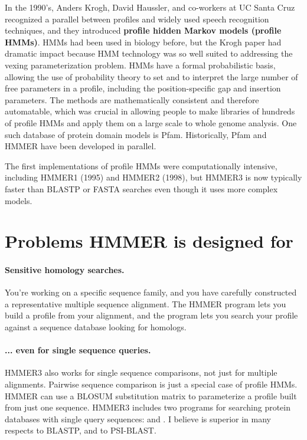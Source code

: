 In the 1990's, Anders Krogh, David Haussler, and co-workers at UC
Santa Cruz recognized a parallel between profiles and widely used
speech recognition techniques, and they introduced \textbf{profile
  hidden Markov models (profile HMMs)}.\cite{Krogh94} HMMs had been
used in biology before, but the Krogh paper had dramatic impact
because HMM technology was so well suited to addressing the vexing
parameterization problem. HMMs have a formal probabilistic basis,
allowing the use of probability theory to set and to interpret the
large number of free parameters in a profile, including the
position-specific gap and insertion parameters. The methods are
mathematically consistent and therefore automatable, which was crucial
in allowing people to make libraries of hundreds of profile HMMs and
apply them on a large scale to whole genome analysis.  One such
database of protein domain models is Pfam.\cite{Sonnhammer97}
Historically, Pfam and HMMER have been developed in parallel.

The first implementations of profile HMMs were computationally
intensive, including HMMER1 (1995) and HMMER2 (1998), but HMMER3 is
now typically faster than BLASTP or FASTA searches even though it uses
more complex models.



\section{Problems HMMER is designed for}

\paragraph{Sensitive homology searches.}
You're working on a specific sequence family, and you have carefully
constructed a representative multiple sequence alignment. The HMMER
 program lets you build a profile from your alignment,
and the  program lets you search your profile against
a sequence database looking for homologs.

\paragraph{... even for single sequence queries.}
HMMER3 also works for single sequence comparisons, not just for
multiple alignments. Pairwise sequence comparison is just a special
case of profile HMMs. HMMER can use a BLOSUM substitution matrix to
parameterize a profile built from just one sequence.  HMMER3 includes
two programs for searching protein databases with single query
sequences:  and . I believe
 is superior in many respects to BLASTP, and
 to PSI-BLAST.

